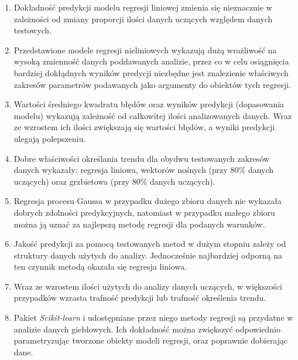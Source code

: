 \begin{enumerate}
 \item Dokładność predykcji modelu regresji liniowej zmienia się nieznacznie w zależności od zmiany proporcji ilości danych uczących względem danych testowych.
 \item Przedstawione modele regresji nieliniowych wykazują dużą wrażliwość na wysoką zmienność danych poddawanych analizie, przez co w celu osiągnięcia bardziej dokłądnych wyników predycji niezbędne jest znalezienie właściwych zakresów parametrów podawanych jako argumenty do obiektów tych regresji.
 \item Wartości średniego kwadratu błędów oraz wyników predykcji (dopasowania modelu) wykazują zależność od całkowitej ilości analizowanych danych. Wraz ze wzrostem ich ilości zwiększają się wartości błędów, a wyniki predykcji ulegają polepszeniu.
 \item Dobre właściwości określania trendu dla obydwu testowanych zakresów danych wykazały: regresja liniowa, wektorów nośnych (przy 80\% danych uczących) oraz grzbietowa (przy 80\% danych uczących).
 \item Regresja procesu Gaussa w przypadku dużego zbioru danych nie wykazała dobrych zdolności predykcyjnych, natomiast w przypadku małego zbioru można ją uznać za najlepszą metodę regresji dla podanych warunków.
 \item Jakość predykcji za pomocą testowanych metod w dużym stopniu zależy od struktury danych użytych do analizy. Jednocześnie najbardziej odporną na ten czynnik metodą okazała się regresja liniowa.
 \item Wraz ze wzrostem ilości użytych do analizy danych uczących, w większości przypadków wzrasta trafność predykcji lub trafność określenia trendu.
 \item Pakiet \textit{Scikit-learn} i udostępniane przez niego metody regresji są przydatne w analizie danych giełdowych. Ich dokładność można zwiększyć odpowiednio parametryzując tworzone obiekty modeli regresji, oraz poprawnie dobierając dane.
\end{enumerate}

